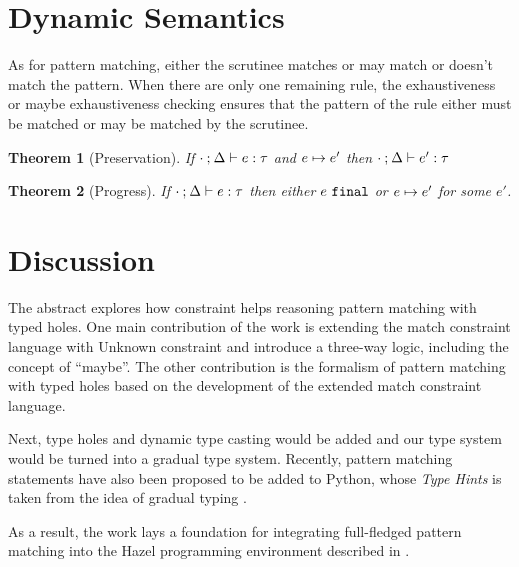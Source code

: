 \documentclass[acmsmall,screen,review,nonacm]{acmart}
\theoremstyle{slplain}
\newtheorem{thm}{Theorem}  %
\numberwithin{thm}{section}
\begin{document}
\section{Dynamic Semantics}
\label{sec:dynamics}

As for pattern matching, either the scrutinee matches or may match or doesn't match the pattern.
When there are only one remaining rule, the exhaustiveness or maybe exhaustiveness checking ensures that the pattern of the rule either must be matched or may be matched by the scrutinee.

\begin{thm}[Preservation]
  \label{thrm:preservation}
  If $\cdot \mathbin{;} \Delta \vdash e : \tau$ and $e \mapsto e'$
  then $\cdot \mathbin{;} \Delta \vdash e' : \tau$
\end{thm}

\begin{thm}[Progress]
 \label{thrm:progress}
 If $\cdot \mathbin{;} \Delta \vdash e : \tau$ then either $e ~\mathtt{final}$ or $e \mapsto e'$ for some $e'$.
\end{thm}

\section{Discussion}
The abstract explores how constraint helps reasoning pattern matching with typed holes.
One main contribution of the work is extending the match constraint language \cite{Harper2012} with Unknown constraint and introduce a three-way logic, including the concept of ``maybe''. The other contribution is the formalism of pattern matching with typed holes based on the development of the extended match constraint language.

Next, type holes and dynamic type casting would be added and our type system would be turned into a gradual type system.
Recently, pattern matching statements have also been proposed to be added to \textsf{Python}, whose \emph{Type Hints} is taken from the idea of gradual typing \cite{pep484,pep622,Siek2006}.

As a result, the work lays a foundation for integrating full-fledged pattern matching into the \textsf{Hazel} programming environment described in \citet{DBLP:journals/pacmpl/OmarVCH19}.

\clearpage



\end{document}
